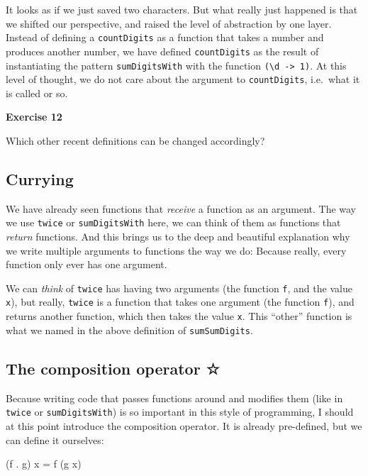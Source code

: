\documentclass[11pt,
  american,
  DIV13]{article}
\newenvironment{Shaded}{}{}
\newcommand{\NormalTok}[1]{#1}
\newcommand{\OperatorTok}[1]{\textcolor[rgb]{0.40,0.40,0.40}{#1}}
\newcommand{\OtherTok}[1]{\textcolor[rgb]{0.00,0.44,0.13}{#1}}
\begin{document}
It looks as if we just saved two characters. But what really just
happened is that we shifted our perspective, and raised the level of
abstraction by one layer. Instead of defining a \texttt{countDigits} as
a function that takes a number and produces another number, we have
defined \texttt{countDigits} as the result of instantiating the pattern
\texttt{sumDigitsWith} with the function
\texttt{(\textbackslash{}d\ -\textgreater{}\ 1)}. At this level of
thought, we do not care about the argument to \texttt{countDigits},
i.e.~what it is called or so.

\textbf{Exercise 12}

Which other recent definitions can be changed accordingly?

\hypertarget{currying}{%
\subsection{Currying}\label{currying}}

We have already seen functions that \emph{receive} a function as an
argument. The way we use \texttt{twice} or \texttt{sumDigitsWith} here,
we can think of them as functions that \emph{return} functions. And this
brings us to the deep and beautiful explanation why we write multiple
arguments to functions the way we do: Because really, every function
only ever has one argument.

We can \emph{think} of \texttt{twice} has having two arguments (the
function \texttt{f}, and the value \texttt{x}), but really,
\texttt{twice} is a function that takes one argument (the function
\texttt{f}), and returns another function, which then takes the value
\texttt{x}. This ``other'' function is what we named in the above
definition of \texttt{sumSumDigits}.

\hypertarget{the-composition-operator}{%
\subsection{The composition operator ☆}\label{the-composition-operator}}

Because writing code that passes functions around and modifies them
(like in \texttt{twice} or \texttt{sumDigitsWith}) is so important in
this style of programming, I should at this point introduce the
composition operator. It is already pre-defined, but we can define it
ourselves:

\begin{Shaded}
\begin{Highlighting}[]
\NormalTok{(f }\OperatorTok{.}\NormalTok{ g) x }\OtherTok{=}\NormalTok{ f (g x)}
\end{Highlighting}
\end{Shaded}
\end{document}
